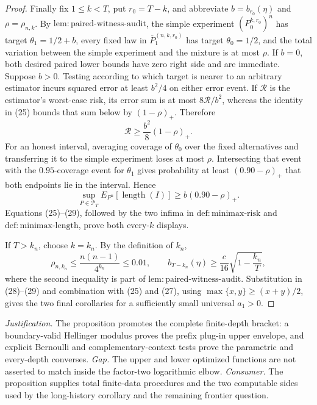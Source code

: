 \documentclass{article}
\begin{document}
\begin{proof}
Finally fix \(1\leq k<T\), put \(r_0=T-k\), and abbreviate \(b=b_{r_0}(\eta)\) and \(\rho=\rho_{n,k}\).  By \(\mathrm{lem:paired\text{-}witness\text{-}audit}\), the simple experiment \((P_0^{k,r_0})^n\) has target \(\theta_1=1/2+b\), every fixed law in \(\overline P_1^{(n,k,r_0)}\) has target \(\theta_0=1/2\), and the total variation between the simple experiment and the mixture is at most \(\rho\).  If \(b=0\), both desired paired lower bounds have zero right side and are immediate.  Suppose \(b>0\).  Testing according to which target is nearer to an arbitrary estimator incurs squared error at least \(b^2/4\) on either error event.  If \(\mathcal R\) is the estimator's worst-case risk, its error sum is at most \(8\mathcal R/b^2\), whereas the identity in (25) bounds that sum below by \((1-\rho)_+\).  Therefore
\[
\mathcal R\geq\frac{b^2}{8}(1-\rho)_+.
\tag{28}
\]
For an honest interval, averaging coverage of \(\theta_0\) over the fixed alternatives and transferring it to the simple experiment loses at most \(\rho\).  Intersecting that event with the \(0.95\)-coverage event for \(\theta_1\) gives probability at least \((0.90-\rho)_+\) that both endpoints lie in the interval.  Hence
\[
\sup_{P\in\mathcal P_T}E_{P^n}[\operatorname{length}(I)]
\geq b(0.90-\rho)_+.
\tag{29}
\]
Equations (25)--(29), followed by the two infima in \(\mathrm{def:minimax\text{-}risk}\) and \(\mathrm{def:minimax\text{-}length}\), prove both every-\(k\) displays.

If \(T>k_n\), choose \(k=k_n\).  By the definition of \(k_n\),
\[
\rho_{n,k_n}\leq\frac{n(n-1)}{4^{k_n}}\leq0.01,
\qquad
b_{T-k_n}(\eta)\geq\frac c{16}\sqrt{1-\frac{k_n}{T}},
\tag{30}
\]
where the second inequality is part of \(\mathrm{lem:paired\text{-}witness\text{-}audit}\).  Substitution in (28)--(29) and combination with (25) and (27), using \(\max\{x,y\}\geq(x+y)/2\), gives the two final corollaries for a sufficiently small universal \(a_1>0\).
\end{proof}
\par\smallskip\noindent \textit{Justification.} The proposition promotes the complete finite-depth bracket: a boundary-valid Hellinger modulus proves the prefix plug-in upper envelope, and explicit Bernoulli and complementary-context tests prove the parametric and every-depth converses. \textit{Gap.} The upper and lower optimized functions are not asserted to match inside the factor-two logarithmic elbow. \textit{Consumer.} The proposition supplies total finite-data procedures and the two computable sides used by the long-history corollary and the remaining frontier question.
\end{document}
